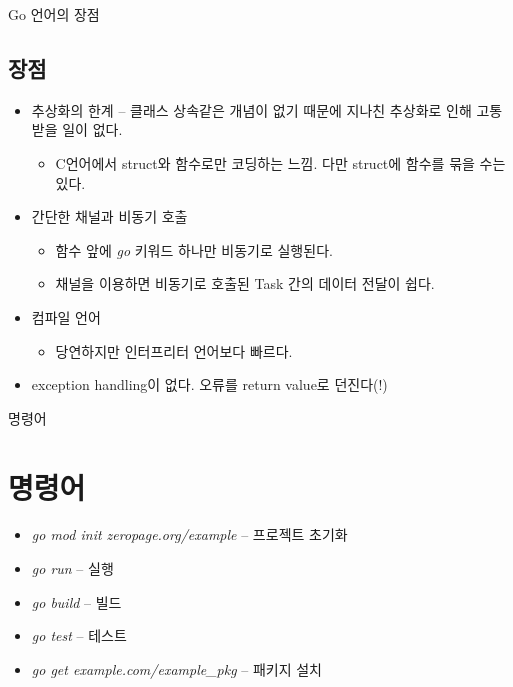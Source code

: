 \documentclass{beamer}
\begin{document}
 \begin{frame}{Go 언어의 장점}
 \subsection{장점}
  \begin{itemize}
   \item 추상화의 한계 -- 클래스 상속같은 개념이 없기 때문에 지나친 추상화로 인해 고통받을 일이 없다.
   \begin{itemize}
    \item C언어에서 struct와 함수로만 코딩하는 느낌. 다만 struct에 함수를 묶을 수는 있다.
   \end{itemize}

   \item 간단한 채널과 비동기 호출
   \begin{itemize}
    \item 함수 앞에 \textit{go} 키워드 하나만 비동기로 실행된다.
    \item 채널을 이용하면 비동기로 호출된 Task 간의 데이터 전달이 쉽다.
   \end{itemize}

   \item 컴파일 언어
   \begin{itemize}
    \item 당연하지만 인터프리터 언어보다 빠르다.
   \end{itemize}

   \item exception handling이 없다. 오류를 return value로 던진다(!)
  \end{itemize}

 \end{frame}

 \begin{frame}{명령어}
  \section{명령어}
  \begin{itemize}
   \item \textit{go mod init zeropage.org/example} -- 프로젝트 초기화
   \item \textit{go run} -- 실행
   \item \textit{go build} -- 빌드
   \item \textit{go test} -- 테스트
   \item \textit{go get example.com/example\_pkg} -- 패키지 설치
  \end{itemize}

 \end{frame}
\end{document}
